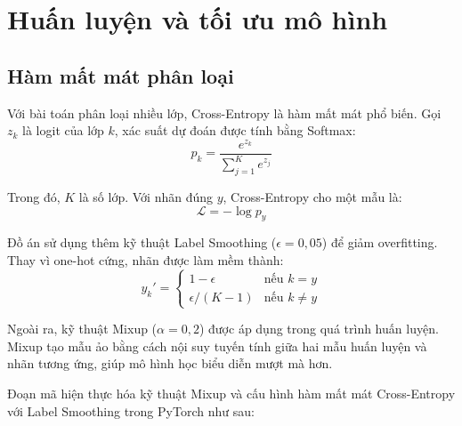 \section{Huấn luyện và tối ưu mô hình}

\subsection{Hàm mất mát phân loại}

Với bài toán phân loại nhiều lớp, Cross-Entropy là hàm mất mát phổ biến. Gọi $z_k$ là logit của lớp $k$, xác suất dự đoán được tính bằng Softmax:
\begin{equation}
  p_k=\frac{e^{z_k}}{\sum_{j=1}^{K}e^{z_j}}
\end{equation}

Trong đó, $K$ là số lớp. Với nhãn đúng $y$, Cross-Entropy cho một mẫu là:
\begin{equation}
  \mathcal{L}=-\log p_y
\end{equation}

Đồ án sử dụng thêm kỹ thuật Label Smoothing ($\epsilon=0{,}05$) để giảm overfitting. Thay vì one-hot cứng, nhãn được làm mềm thành:
\begin{equation}
  y_k'=\begin{cases} 1-\epsilon & \text{nếu } k=y \\ \epsilon/(K-1) & \text{nếu } k\neq y \end{cases}
\end{equation}

Ngoài ra, kỹ thuật Mixup ($\alpha=0{,}2$) được áp dụng trong quá trình huấn luyện. Mixup tạo mẫu ảo bằng cách nội suy tuyến tính giữa hai mẫu huấn luyện và nhãn tương ứng, giúp mô hình học biểu diễn mượt mà hơn.

Đoạn mã hiện thực hóa kỹ thuật Mixup và cấu hình hàm mất mát Cross-Entropy với Label Smoothing trong PyTorch như sau:


